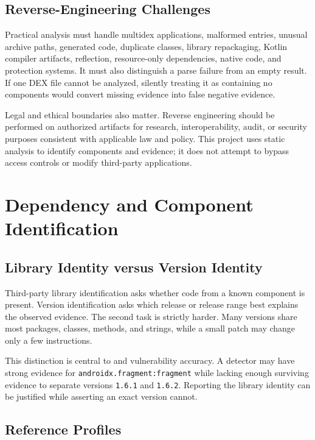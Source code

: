 \subsection{Reverse-Engineering Challenges}

Practical analysis must handle multidex applications, malformed entries,
unusual archive paths, generated code, duplicate classes, library repackaging,
Kotlin compiler artifacts, reflection, resource-only dependencies, native
code, and protection systems. It must also distinguish a parse failure from an
empty result. If one DEX file cannot be analyzed, silently treating it as
containing no components would convert missing evidence into false negative
evidence.

Legal and ethical boundaries also matter. Reverse engineering should be
performed on authorized artifacts for research, interoperability, audit, or
security purposes consistent with applicable law and policy. This project
uses static analysis to identify components and evidence; it does not attempt
to bypass access controls or modify third-party applications.

\section{Dependency and Component Identification}

\subsection{Library Identity versus Version Identity}

Third-party library identification asks whether code from a known component is
present. Version identification asks which release or release range best
explains the observed evidence. The second task is strictly harder. Many
versions share most packages, classes, methods, and strings, while a small
patch may change only a few instructions.

This distinction is central to \SBOM and vulnerability accuracy. A detector
may have strong evidence for \texttt{androidx.fragment:fragment} while lacking
enough surviving evidence to separate versions \texttt{1.6.1} and
\texttt{1.6.2}. Reporting the library identity can be justified while
asserting an exact version cannot.

\subsection{Reference Profiles}

